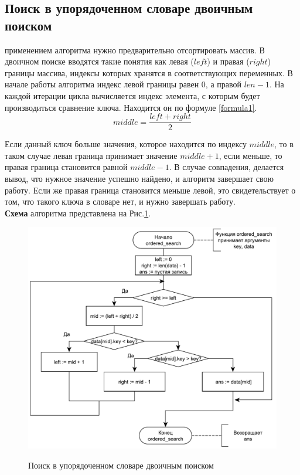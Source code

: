 \newpage
\subsection{Поиск в упорядоченном словаре двоичным поиском}
 применением алгоритма нужно предварительно отсортировать массив.
В двоичном поиске вводятся такие понятия как левая ($left$) и правая ($right$) границы массива, индексы которых хранятся в соответствующих переменных. В начале работы алгоритма индекс левой границы равен 0, а правой $len - 1$. На каждой итерации цикла вычисляется индекс элемента, с которым будет производиться сравнение ключа. Находится он по формуле \ref{formula1}.
\begin{equation}\label{formula1}
	middle = \frac{left + right}{2}
\end{equation} 

Если данный ключ больше значения, которое находится по индексу $middle$, то в таком случае левая граница принимает значение $middle + 1$, если меньше, то правая граница становится равной $middle - 1$. В случае совпадения, делается вывод, что нужное значение успешно найдено, и алгоритм завершает свою работу. Если же правая граница становится меньше левой, это свидетельствует о том, что такого ключа в словаре нет, и нужно завершать работу.\\

\textbf{Схема} алгоритма представлена на Рис.\ref{fig2:image}.
\begin{figure}[h]
	\begin{center}
		{\includegraphics[scale = 0.6]{schemes/sort}}
		\caption{Поиск в упорядоченном словаре двоичным поиском}
		\label{fig2:image}
	\end{center}
\end{figure}

